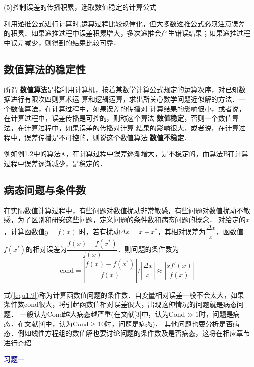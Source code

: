 (5)控制误差的传播积累，选取数值稳定的计算公式

利用递推公式进行计算时,运算过程比较规律化，但大多数递推公式必须注意误差的积累．如果递推过程中误差积累增大，多次递推会产生错误结果；如果递推过程中误差减少，则得到的结果比较可靠．

\subsection{数值算法的稳定性}
所谓{\bf
数值算法}是指利用计算机，按着某数学计算公式规定的运算次序，对已知数据进行有限次四则算术运
算和逻辑运算，求出所关心数学问题近似解的方法．一个数值算法，在计算过程中，如果误差的传播对
计算结果的影响很小，或者说，在计算过程中，误差传播是可控的，则称这个算法{\bf
数值稳定}，否则一个数值算法，在计算过程中，如果误差的传播对计算
结果的影响很大，或者说，在计算过程中，误差传播是不可控的，则说这个数值算法{\bf
数值不稳定}．

例如例1.2中的算法A，在计算过程中误差逐渐增大，是不稳定的，而算法B在计算过程中误差逐渐减少，是稳定的．
\subsection{病态问题与条件数}
在实际数值计算过程中，有些问题对数值扰动非常敏感，有些问题对数值扰动不敏感，为了区别和研究这些问题，定义问题的条件数和病态问题的概念．
\exam 对给定的$x$，计算函数值$y=f(x)$ 时，若有扰动$\Delta
x=x-x^*$，其相对误差为$\dfrac{\Delta
x}{x}$，函数值$f(x^*)$的相对误差为$\dfrac{f(x)-f(x^*)}{f(x)}$．则问题的条件数为
\begin{equation} \label{equ1.9}
\mbox{cond}=\left|\frac{f(x)-f(x^*)}{f(x)}\right|/\left|\frac{\Delta
x}{x} \right|\approx\left|\frac{xf'(x)}{f(x)}\right|
\end{equation}


式(\ref{equ1.9})称为计算函数值问题的条件数．自变量相对误差一般不会太大，如果条件数cond很大，将引起函数值相对误差很大，出现这种情况的问题就是病态问题．
一般认为Cond越大病态越严重(在文献[3]中，认为$\mathrm{Cond}\gg1$时，问题是病态．在文献[9]中，认为$\mathrm{Cond}\geqslant10$时，问题是病态)．
其他问题也要分析是否病态．例如线性方程组的数值解也要讨论问题的条件数及是否病态，这将在相应章节进行介绍．

\vspace{0.5cm}
 \centerline{\textcolor{darkblue}{\hei{}
 习题一}}\vspace{0.5cm}



